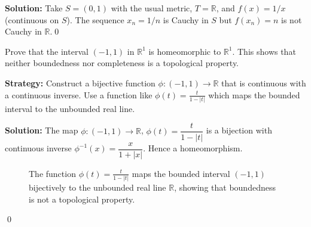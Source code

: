 \bigskip\noindent\textbf{Solution:}
Take $S=(0,1)$ with the usual metric, $T=\mathbb{R}$, and $f(x)=1/x$ (continuous on $S$). The sequence $x_n=1/n$ is Cauchy in $S$ but $f(x_n)=n$ is not Cauchy in $\mathbb{R}$.\qed



\begin{problembox}
\begin{problemstatement}
Prove that the interval $(-1, 1)$ in $\mathbb{R}^1$ is homeomorphic to $\mathbb{R}^1$. This shows that neither boundedness nor completeness is a topological property.
\end{problemstatement}
\end{problembox}

\noindent\textbf{Strategy:} Construct a bijective function $\phi: (-1,1) \to \mathbb{R}$ that is continuous with a continuous inverse. Use a function like $\phi(t) = \frac{t}{1-|t|}$ which maps the bounded interval to the unbounded real line.

\bigskip\noindent\textbf{Solution:}
The map $\phi:(-1,1)\to\mathbb{R}$, $\phi(t)=\dfrac{t}{1-|t|}$ is a bijection with continuous inverse $\phi^{-1}(x)=\dfrac{x}{1+|x|}$. Hence a homeomorphism.

\begin{figure}[h]
\centering
{}
\caption{The function $\phi(t) = \frac{t}{1-|t|}$ maps the bounded interval $(-1,1)$ bijectively to the unbounded real line $\mathbb{R}$, showing that boundedness is not a topological property.}
\end{figure}\qed



